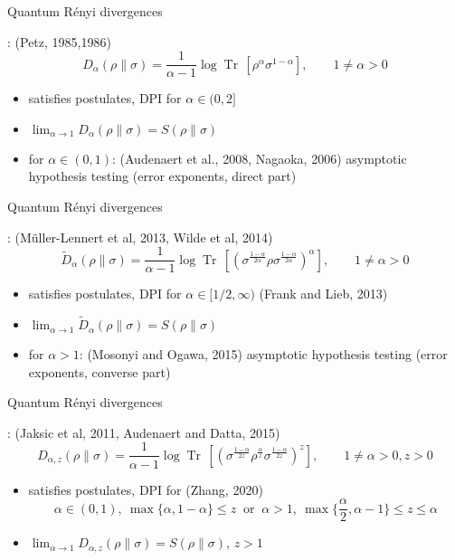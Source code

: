 \documentclass[mathserif]{beamer}
\newcommand{\<}{\langle}
\renewcommand{\>}{\rangle}
\newcommand{\Tr}{\operatorname{Tr}\,}
\begin{document}
\begin{frame}{Quantum R\'enyi divergences}

: (Petz, 1985,1986)
\[
D_\alpha(\rho\|\sigma)=\frac1{\alpha-1}\log\Tr\left[\rho^\alpha\sigma^{1-\alpha}\right], \qquad 1\ne
\alpha>0
\]
\begin{itemize}
\item satisfies postulates, DPI for $\alpha\in (0,2]$
\vskip 3mm
\item $\lim_{\alpha\to 1} D_\alpha(\rho\|\sigma)=S(\rho\|\sigma)$
\vskip 3mm
\item {} for $\alpha\in (0,1)$: (Audenaert et al., 2008, Nagaoka, 2006)
\vskip 2mm
asymptotic hypothesis testing (error
exponents, direct part) 

\end{itemize}

\end{frame}


\begin{frame}{Quantum R\'enyi divergences}

: (M\"uller-Lennert et al,
2013, Wilde et al, 2014) 
\[
\tilde
D_\alpha(\rho\|\sigma)=\frac1{\alpha-1}\log\Tr\left[\left(\sigma^{\frac{1-\alpha}{2\alpha}}\rho\sigma^{\frac{1-\alpha}{2\alpha}}\right)^\alpha\right],\qquad
1\ne \alpha>0
\]
\begin{itemize}
\item satisfies postulates, DPI for $\alpha\in [1/2,\infty)$ (Frank and Lieb, 2013)

\vskip 3mm
\item $\lim_{\alpha\to 1} \tilde D_\alpha(\rho\|\sigma)=S(\rho\|\sigma)$
\vskip 3mm
\item {} for $\alpha>1$: (Mosonyi and Ogawa, 2015)
\vskip 2mm
asymptotic hypothesis testing (error
exponents, converse part) 

\end{itemize}

\end{frame}


\begin{frame}{Quantum R\'enyi divergences}

: (Jaksic et al, 2011, Audenaert and Datta, 2015)
\[
D_{\alpha,z}(\rho\|\sigma)
=\frac1{\alpha-1}\log\Tr\left[\left(\sigma^{\frac{1-\alpha}{2z}}\rho^{\frac{\alpha}{z}}\sigma^{\frac{1-\alpha}{2z}}\right)^z
\right],\qquad 1\ne \alpha>0, z>0
\]
\begin{itemize}
\item satisfies postulates, DPI for (Zhang, 2020)
\[
\alpha\in (0,1),\ \max\{\alpha,1-\alpha\}\le z\ \text{ or }\ \alpha>1,\
\max\{\frac{\alpha}2,\alpha-1\}\le z\le \alpha
\]
\item $\lim_{\alpha\to 1} D_{\alpha,z}(\rho\|\sigma)=S(\rho\|\sigma)$, $z>1$

\end{itemize}



\end{frame}
\end{document}
